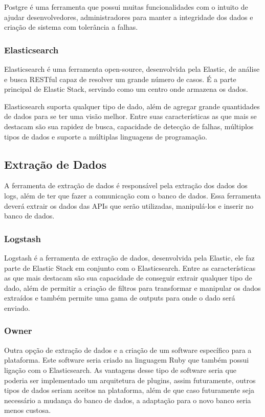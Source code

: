 Postgre é uma ferramenta que possui muitas funcionalidades com o intuito de ajudar desenvolvedores, administradores para manter a integridade dos dados e criação de sistema com tolerância a falhas.
\subsubsection*{Elasticsearch}
Elasticsearch é uma ferramenta open-source, desenvolvida pela Elastic, de análise e busca RESTful capaz de resolver um grande número de casos. É a parte principal de Elastic Stack, servindo como um centro onde armazena os dados\cite{elasticsearch}.

Elasticsearch suporta qualquer tipo de dado, além de agregar grande quantidades de dados para se ter uma visão melhor. Entre suas características as que mais se destacam são sua rapidez de busca, capacidade de detecção de falhas, múltiplos tipos de dados e suporte a múltiplas linguagens de programação.
\subsection{Extração de Dados}
A ferramenta de extração de dados é responsável pela extração dos dados dos logs, além de ter que fazer a comunicação com o banco de dados. Essa ferramenta deverá extrair os dados das APIs que serão utilizadas, manipulá-los e inserir no banco de dados.
\subsubsection*{Logstash}
Logstash é a ferramenta de extração de dados, desenvolvida pela Elastic, ele faz parte de Elastic Stack em conjunto com o Elasticsearch. Entre as características as que mais destacam são sua capacidade de conseguir extrair qualquer tipo de dado, além de permitir a criação de filtros para transformar e manipular os dados extraídos e também permite uma gama de outputs para onde o dado será enviado\cite{logstash}.
\subsubsection*{Owner}
Outra opção de extração de dados e a criação de um software específico para a plataforma. Este software seria criado na linguagem Ruby que também possui ligação com o Elasticsearch. As vantagens desse tipo de software seria que poderia ser implementado um arquitetura de plugins, assim futuramente, outros tipos de dados seriam aceitos na plataforma, além de que caso futuramente seja necessário a mudança do banco de dados, a adaptação para o novo banco seria menos custosa.
